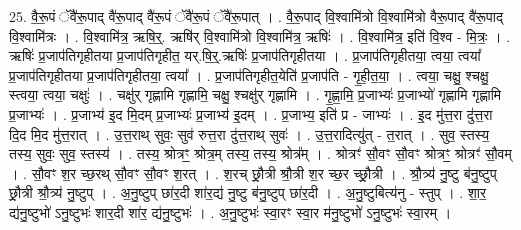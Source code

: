 \documentclass[17pt]{extarticle}
\begin{document}
25. वै॒रू॒पं ॅवै॑रू॒पाद् वै॑रू॒पाद् वै॑रू॒पं ॅवै॑रू॒पं ॅवै॑रू॒पात् । . वै॒रू॒पाद् वि॒श्वामि॑त्रो वि॒श्वामि॑त्रो वैरू॒पाद् वै॑रू॒पाद् वि॒श्वामि॑त्रः । . वि॒श्वामि॑त्र॒ ऋषि॒र्॒. ऋषि॑र् वि॒श्वामि॑त्रो वि॒श्वामि॑त्र॒ ऋषिः॑ । . वि॒श्वामि॑त्र॒ इति॑ वि॒श्व - मि॒त्रः॒ । . ऋषिः॑ प्र॒जाप॑तिगृहीतया प्र॒जाप॑तिगृहीत॒ यर्.षि॒र्॒.ऋषिः॑ प्र॒जाप॑तिगृहीतया । . प्र॒जाप॑तिगृहीतया॒ त्वया॒ त्वया᳚ प्र॒जाप॑तिगृहीतया प्र॒जाप॑तिगृहीतया॒ त्वया᳚ । . प्र॒जाप॑तिगृहीत॒येति॑ प्र॒जाप॑ति - गृ॒ही॒त॒या॒ । . त्वया॒ चक्षु॒ श्चक्षु॒ स्त्वया॒ त्वया॒ चक्षुः॑ । . चक्षु॑र् गृह्णामि गृह्णामि॒ चक्षु॒ श्चक्षु॑र् गृह्णामि । . गृ॒ह्णा॒मि॒ प्र॒जाभ्यः॑ प्र॒जाभ्यो॑ गृह्णामि गृह्णामि प्र॒जाभ्यः॑ । . प्र॒जाभ्य॑ इ॒द मि॒दम् प्र॒जाभ्यः॑ प्र॒जाभ्य॑ इ॒दम् । . प्र॒जाभ्य॒ इति॑ प्र - जाभ्यः॑ । . इ॒द मु॑त्त॒रा दु॑त्त॒रा दि॒द मि॒द मु॑त्त॒रात् । . उ॒त्त॒राथ् सुवः॒ सुव॑ रुत्त॒रा दु॑त्त॒राथ् सुवः॑ । . उ॒त्त॒रादित्यु॑त् - त॒रात् । . सुव॒ स्तस्य॒ तस्य॒ सुवः॒ सुव॒ स्तस्य॑ । . तस्य॒ श्रोत्रꣳ॒॒ श्रोत्र॒म् तस्य॒ तस्य॒ श्रोत्र᳚म् । . श्रोत्रꣳ॑ सौ॒वꣳ सौ॒वꣳ श्रोत्रꣳ॒॒ श्रोत्रꣳ॑ सौ॒वम् । . सौ॒वꣳ श॒र च्छ॒रथ् सौ॒वꣳ सौ॒वꣳ श॒रत् । . श॒रच् छ्रौ॒त्री श्रौ॒त्री श॒र च्छ॒र च्छ्रौ॒त्री । . श्रौ॒त्र्य॑ नु॒ष्टु ब॑नु॒ष्टुप् छ्रौ॒त्री श्रौ॒त्र्य॑ नु॒ष्टुप् । . अ॒नु॒ष्टुप् छा॑र॒दी शा॑र॒द्य॑ नु॒ष्टु ब॑नु॒ष्टुप् छा॑र॒दी । . अ॒नु॒ष्टुबित्य॑नु - स्तुप् । . शा॒र॒ द्य॑नु॒ष्टुभो॑ ऽनु॒ष्टुभः॑ शार॒दी शा॑र॒ द्य॑नु॒ष्टुभः॑ । . अ॒नु॒ष्टुभः॑ स्वा॒रꣳ स्वा॒र म॑नु॒ष्टुभो॑ ऽनु॒ष्टुभः॑ स्वा॒रम् । \newline
\end{document}
